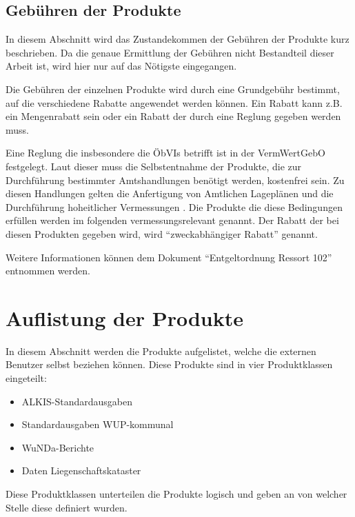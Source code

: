 \subsection{Gebühren der Produkte} \label{subsec:gebuehren}
In diesem Abschnitt wird das Zustandekommen der Gebühren der Produkte kurz beschrieben.
Da die genaue Ermittlung der Gebühren nicht Bestandteil dieser Arbeit ist, wird hier nur auf das Nötigste eingegangen. 

Die Gebühren der einzelnen Produkte wird durch eine Grundgebühr bestimmt, auf die verschiedene Rabatte angewendet werden können.
Ein Rabatt kann z.B. ein Mengenrabatt sein oder ein Rabatt der durch eine Reglung gegeben werden muss. 

Eine Reglung die insbesondere die \acp{ÖbVI} betrifft ist in der \ac{VermWertGebO} festgelegt.
Laut dieser muss die Selbstentnahme der Produkte, die zur Durchführung bestimmter Amtshandlungen benötigt werden, kostenfrei sein.
Zu diesen Handlungen gelten die Anfertigung von Amtlichen Lageplänen und die Durchführung hoheitlicher Vermessungen \autocite[vgl.][]{wupp-wunda-oebvi}.
Die Produkte die diese Bedingungen erfüllen werden im folgenden vermessungsrelevant genannt. Der Rabatt der bei diesen Produkten gegeben wird, wird "`zweckabhängiger Rabatt"' genannt.

Weitere Informationen können dem Dokument "`Entgeltordnung Ressort 102"' \autocite{wupp-entgelt} entnommen werden.

\section{Auflistung der Produkte} \label{sec:produktliste}
In diesem Abschnitt werden die Produkte aufgelistet, welche die externen Benutzer selbst beziehen können. Diese Produkte sind in vier Produktklassen eingeteilt:
\begin{itemize}
	\item ALKIS-Standardausgaben
	\item Standardausgaben WUP-kommunal
	\item WuNDa-Berichte
	\item Daten Liegenschaftskataster
\end{itemize}
Diese Produktklassen unterteilen die Produkte logisch und geben an von welcher Stelle diese definiert wurden.

